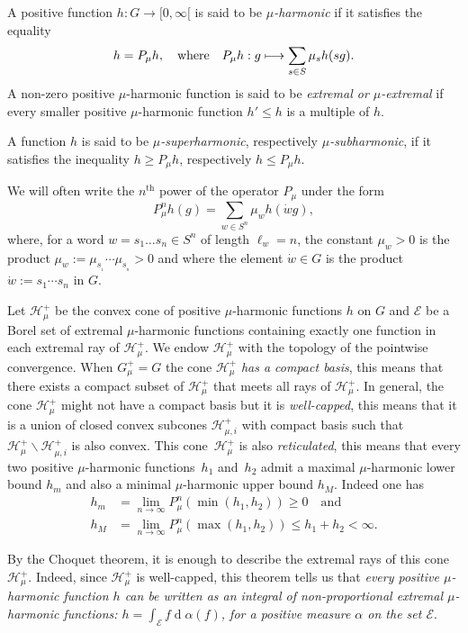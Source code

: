 \documentclass[JEP,XML,SOM,Unicode]{cedram}
\let\mathcal\mathscr
\def\mto{\mathchoice{\longmapsto}{\mapsto}{\mapsto}{\mapsto}}
\DeclareMathOperator{\rd}{d}
\theoremstyle{definition}
\newcommand{\mc}[1]{\mathcal{ #1}}
\let\al\alpha
\let\ra\to
\begin{document}
A positive function $h:G\ra [0,\infty[$ is said to be
\emph{$\mu$-harmonic} if it satisfies the equality
\begin{equation}
\label{eqnfghar}
h= P_{\mu}h,
\quad\text{where}\quad
P_{\mu}h: g\mto \sum_{s\in S}\mu_s h(sg).
\end{equation}
A non-zero positive $\mu$-harmonic function is said to be \emph{extremal
or $\mu$-extremal} if every smaller positive $\mu$-harmonic function
$h'\leq h$ is a multiple of $h$.

A function $h$ is said to be \emph{$\mu$-superharmonic},
respectively \emph{$\mu$-subharmonic},
if it satisfies the inequality $h\geq P_{\mu}h$, respectively $h\leq P_{\mu}h$.

We will often write the $n^\mathrm{th}$ power of the operator $P_\mu$ under the form
\begin{equation}
\label{eqnpmun}
P_{\mu}^nh(g)= \sum_{w\in S^n}\mu_w h(\dot{w}g),
\end{equation}
where, for a word $w=s_1\ldots s_n\in S^n$ of length $\ell_w=n$,
the constant $\mu_w>0$ is the product
$\mu_w:=\mu_{s_{_1}}\cdots \mu_{s_{_n}}>0$
and where the element $\dot{w}\in G$ is the product $\dot{w}:=s_1\cdots s_n$ in $G$.

Let $\mc H_\mu^+$ be the convex cone of positive
$\mu$-harmonic functions $h$ on $G$
and $\mc E$ be a Borel set of extremal $\mu$-harmonic functions containing exactly one
function in each extremal ray of $\mc H_\mu^+$.
We endow $\mc H_\mu^+$ with the topology of the pointwise convergence.
When $G_\mu^+=G$ the cone $\mc H_\mu^+$ \emph{has a compact basis},
this means that there exists a compact subset of $\mc H_\mu^+$
that meets all rays of $\mc H_\mu^+$.
In general, the cone $\mc H_\mu^+$ might not have a compact basis but it is \emph{well-capped},
this means that it is a union of closed convex subcones $\mc H_{\mu,i}^+$
with compact basis such that $\mc H_\mu^+\smallsetminus \mc H_{\mu,i}^+$
is also convex.
This cone~$\mc H_\mu^+$ is also \emph{reticulated}, this means that
every two positive $\mu$-harmonic functions~$h_1$ and~$h_2$
admit a maximal $\mu$-harmonic lower bound $h_m$ and also
a minimal $\mu$-harmonic upper bound $h_M$.
Indeed one has
\begin{align*}
h_m
&=
\lim_{n\ra\infty}P^n_\mu (\min(h_1,h_2))\geq 0
\quad\text{and}\quad \\
h_M
&=
\lim_{n\ra\infty}P^n_\mu (\max(h_1,h_2))
\leq h_1+ h_2<\infty.
\end{align*}

By the Choquet theorem, it is enough to describe the extremal rays of this cone~$\mc H_\mu^+$.
Indeed, since $\mc H_\mu^+$ is well-capped, this theorem tells us
that \emph{every positive $\mu$-harmonic function $h$
can be written as an integral of non-proportional
extremal $\mu$-harmonic functions:
$h=\int_{\mc E}f\rd \al(f)$,
for a positive measure $\al$
on the set $\mc E$}.
\end{document}

